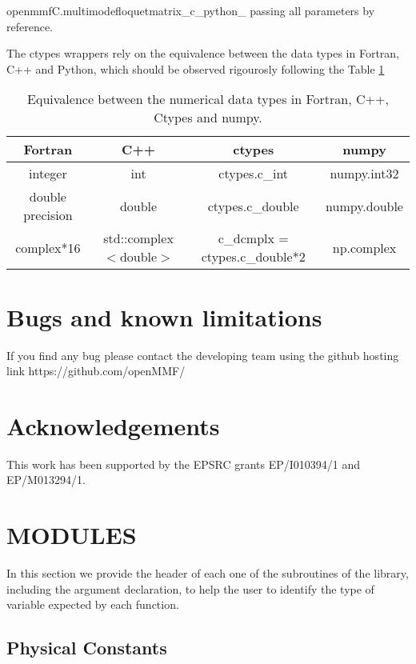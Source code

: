 \documentclass[10pt,a4paper]{article}
\begin{document}
\noindent
  openmmfC.multimodefloquetmatrix\_c\_python\_  passing all parameters by reference. 

The ctypes wrappers rely on the equivalence between the data types in Fortran, C++ and Python, which should be observed rigourosly following the Table \ref{tb:datatypes}

\begin{table}[!h]
\centering
\begin{tabular}[t]{|c|c|c|c|}\firsthline
\textbf{Fortran}          & \textbf{C++}    & \textbf{ctypes}          & \textbf{numpy} \\  \hline
integer          & int    & ctypes.c\_int     & numpy.int32 \\ \hline
double precision & double & ctypes.c\_double & numpy.double \\ \hline
complex*16 & std::complex $<$double$>$& c\_dcmplx = ctypes.c\_double*2 & np.complex \\ \hline
\end{tabular}
\caption{\label{tb:datatypes} Equivalence between the numerical data types in Fortran, C++, Ctypes and numpy.}
\end{table}


\section{Bugs and known limitations}

If you find any bug please contact the developing team using the github hosting link https://github.com/openMMF/

\section{Acknowledgements}

This work has been supported by the EPSRC grants EP/I010394/1 and EP/M013294/1.



\newpage
\section{MODULES}

In this section we provide the header of each one of the subroutines of the library, including the argument declaration, to help the user to identify the type of variable expected by each function.

\subsection{Physical Constants}
\end{document}
